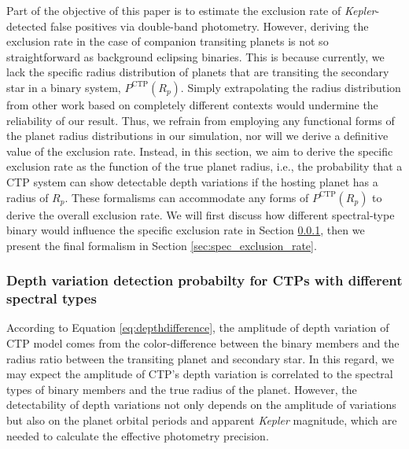 \documentclass{aastex63}
\begin{document}
    Part of the objective of this paper is to estimate the exclusion rate of \emph{Kepler}-detected false positives via double-band photometry. However, deriving the exclusion rate in the case of companion transiting planets is not so straightforward as background eclipsing binaries. This is because currently, we lack the specific radius distribution of planets that are transiting the secondary star in a binary system, $P^\mathrm{CTP} (R_p)$. Simply extrapolating the radius distribution from other work based on completely different contexts would undermine the reliability of our result. Thus, we refrain from employing any functional forms of the planet radius distributions in our simulation, nor will we derive a definitive value of the exclusion rate. Instead, in this section, we aim to derive the specific exclusion rate as the function of the true planet radius, i.e., the probability that a CTP system can show detectable depth variations if the hosting planet has a radius of $R_p$. These formalisms can accommodate any forms of $P^\mathrm{CTP} (R_p)$ to derive the overall exclusion rate. We will first discuss how different spectral-type binary would influence the specific exclusion rate in Section \ref{sec:ctp_spec_types}, then we present the final formalism in Section \ref{sec:spec_exclusion_rate}. 
    
    \subsubsection{Depth variation detection probabilty for CTPs with different spectral types}
    \label{sec:ctp_spec_types}

    According to Equation \ref{eq:depthdifference}, the amplitude of depth variation of CTP model comes from the color-difference between the binary members and the radius ratio between the transiting planet and secondary star. In this regard, we may expect the amplitude of CTP's depth variation is correlated to the spectral types of binary members and the true radius of the planet. However, the detectability of depth variations not only depends on the amplitude of variations but also on the planet orbital periods and apparent \emph{Kepler} magnitude, which are needed to calculate the effective photometry precision.
\end{document}
